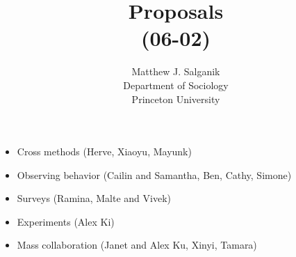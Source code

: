 \documentclass[aspectratio=169]{beamer}
\title[]{Proposals\\(06-02)}
\author[]{Matthew J. Salganik\\Department of Sociology\\Princeton University}
\date[]{Soc 596: Computational Social Science\\Fall 2016
\vfill
\begin{flushright}
\vspace{0.6in}
\texttt{[image: figures/cc.png]}
\end{flushright}
}
\begin{document}
\frame{\titlepage}
\begin{frame}

\begin{itemize}
\item Cross methods (Herve, Xiaoyu, Mayunk)
\item Observing behavior (Cailin and Samantha, Ben, Cathy, Simone)
\item Surveys (Ramina, Malte and Vivek)
\item Experiments (Alex Ki)
\item Mass collaboration (Janet and Alex Ku, Xinyi, Tamara)
\end{itemize}

\end{frame}
\end{document}
